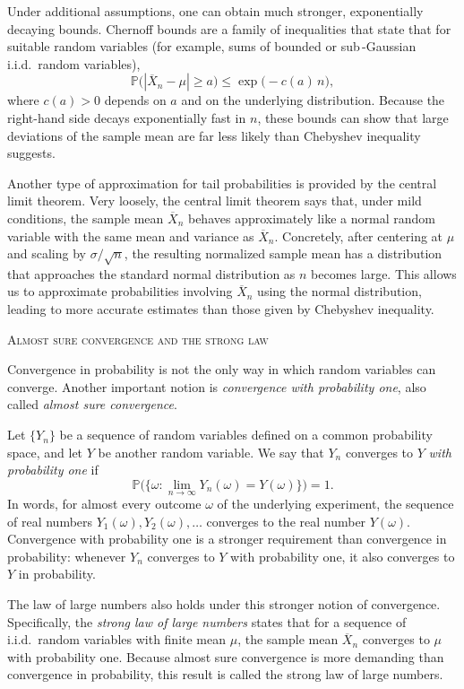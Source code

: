 Under additional assumptions, one can obtain much stronger, exponentially decaying bounds.  
Chernoff bounds are a family of inequalities that state that for suitable random variables (for example, sums of bounded or sub\,-Gaussian i.i.d.\ random variables),
\[
\mathbb{P}\big(|\overline{X}_n - \mu| \ge a\big)
\le
\exp\big(-c(a)\,n\big),
\]
where \(c(a) > 0\) depends on \(a\) and on the underlying distribution.  
Because the right-hand side decays exponentially fast in \(n\), these bounds can show that large deviations of the sample mean are far less likely than Chebyshev inequality suggests.  

Another type of approximation for tail probabilities is provided by the central limit theorem.  
Very loosely, the central limit theorem says that, under mild conditions, the sample mean \(\overline{X}_n\) behaves approximately like a normal random variable with the same mean and variance as \(\overline{X}_n\).  
Concretely, after centering at \(\mu\) and scaling by \(\sigma/\sqrt{n}\), the resulting normalized sample mean has a distribution that approaches the standard normal distribution as \(n\) becomes large.  
This allows us to approximate probabilities involving \(\overline{X}_n\) using the normal distribution, leading to more accurate estimates than those given by Chebyshev inequality.  

\bigskip
\textsc{Almost sure convergence and the strong law}

Convergence in probability is not the only way in which random variables can converge.  
Another important notion is \textit{convergence with probability one}, also called \textit{almost sure convergence}.  

Let \(\{Y_n\}\) be a sequence of random variables defined on a common probability space, and let \(Y\) be another random variable.  
We say that \(Y_n\) converges to \(Y\) \textit{with probability one} if
\[
\mathbb{P}\Big(\big\{\omega : \lim_{n \to \infty} Y_n(\omega) = Y(\omega)\big\}\Big) = 1.
\]
In words, for almost every outcome \(\omega\) of the underlying experiment, the sequence of real numbers \(Y_1(\omega), Y_2(\omega), \dots\) converges to the real number \(Y(\omega)\).  
Convergence with probability one is a stronger requirement than convergence in probability: whenever \(Y_n\) converges to \(Y\) with probability one, it also converges to \(Y\) in probability.  

The law of large numbers also holds under this stronger notion of convergence.  
Specifically, the \textit{strong law of large numbers} states that for a sequence of i.i.d.\ random variables with finite mean \(\mu\), the sample mean \(\overline{X}_n\) converges to \(\mu\) with probability one.  
Because almost sure convergence is more demanding than convergence in probability, this result is called the strong law of large numbers.  

